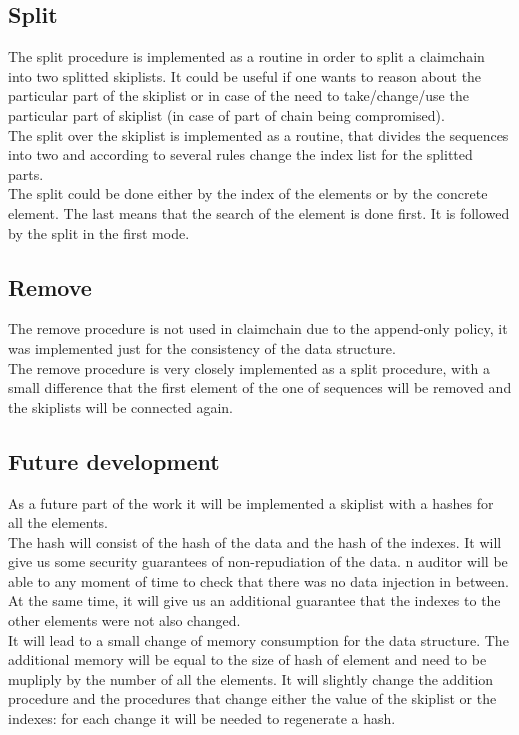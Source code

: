 \documentclass[a4paper]{article}
\begin{document}
\subsection{Split}
The split procedure is implemented as a routine in order to split a claimchain into two splitted skiplists. It could be useful if one wants to reason about the particular part of the skiplist or in case of the need to take/change/use the particular part of skiplist (in case of part of chain being compromised). \\
The split over the skiplist is implemented as a routine, that divides the sequences into two and according to several rules change the index list for the splitted parts.
\\ The split could be done either by the index of the elements or by the concrete element. The last means that the search of the element is done first. It is followed by the split in the first mode. 
\subsection{Remove}
The remove procedure is not used in claimchain due to the append-only policy, it was implemented just for the consistency of the data structure. 
\\ The remove procedure is very closely implemented as a split procedure, with a small difference that the first element of the one of sequences will be removed and the skiplists will be connected again. 
\subsection{Future development}
As a future part of the work it will be implemented a skiplist with a hashes for all the elements. \\ The hash will consist of the hash of the data and the hash of the indexes. It will give us some security guarantees of non-repudiation of the data. n auditor will be able to any moment of time to check that there was no data injection in between.\\ At the same time, it will give us an additional guarantee that the indexes to the other elements were not also changed. \\ It will lead to a small change of memory consumption for the data structure. The additional memory will be equal to the size of hash of element and need to be mupliply by the number of all the elements. It will slightly change the addition procedure and the procedures that change either the value of the skiplist or the indexes: for each change it will be needed to regenerate a hash. 
\end{document}
